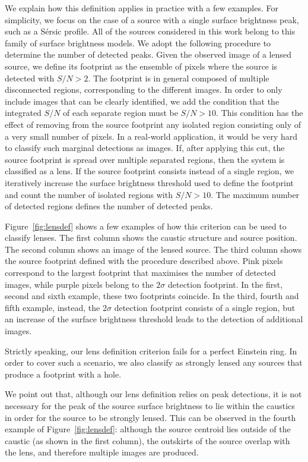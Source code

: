 \documentclass{aa}
\def\Fref#1{Figure~\ref{#1}\xspace}
\begin{document}
We explain how this definition applies in practice with a few examples.
For simplicity, we focus on the case of a source with a single surface brightness peak, such as a S\'{e}rsic profile. All of the sources considered in this work belong to this family of surface brightness models.
We adopt the following procedure to determine the number of detected peaks.
Given the observed image of a lensed source, we define its footprint as the ensemble of pixels where the source is detected with $S/N>2$. The footprint is in general composed of multiple disconnected regions, corresponding to the different images. In order to only include images that can be clearly identified, we add the condition that the integrated $S/N$ of each separate region must be $S/N > 10$. This condition has the effect of removing from the source footprint any isolated region consisting only of a very small number of pixels. In a real-world application, it would be very hard to classify such marginal detections as images.
If, after applying this cut, the source footprint is spread over multiple separated regions, then the system is classified as a lens.
If the source footprint consists instead of a single region, we iteratively increase the surface brightness threshold used to define the footprint and count the number of isolated regions with $S/N>10$. The maximum number of detected regions defines the number of detected peaks.

\Fref{fig:lensdef} shows a few examples of how this criterion can be used to classify lenses.
The first column shows the caustic structure and source position. The second column shows an image of the lensed source. 
The third column shows the source footprint defined with the procedure described above.
Pink pixels correspond to the largest footprint that maximises the number of detected images, while purple pixels belong to the $2\sigma$ detection footprint. In the first, second and sixth example, these two footprints coincide.
In the third, fourth and fifth example, instead, the $2\sigma$ detection footprint consists of a single region, but an increase of the surface brightness threshold leads to the detection of additional images.

Strictly speaking, our lens definition criterion fails for a perfect Einstein ring. In order to cover such a scenario, we also classify as strongly lensed any sources that produce a footprint with a hole.

We point out that, although our lens definition relies on peak detections, it is not necessary for the peak of the source surface brightness to lie within the caustics in order for the source to be strongly lensed.
This can be observed in the fourth example of \Fref{fig:lensdef}: although the source centroid lies outside of the caustic (as shown in the first column), the outskirts of the source overlap with the lens, and therefore multiple images are produced.
\end{document}
